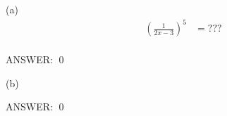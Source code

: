 
(a)
\begin{align*}
\left(
\frac{1}{2x - 3}
\right)^5
&= ??? \\
\end{align*}

ANSWER:
\qed


(b)

ANSWER:
\qed

